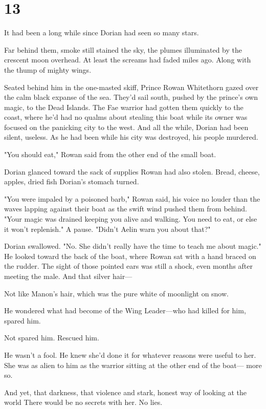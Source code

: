 
\chapter{13}

It had been a long while since Dorian had seen so many stars.

Far behind them, smoke still stained the sky, the plumes illuminated by the crescent moon overhead. At least the screams had faded miles ago. Along with the thump of mighty wings.

Seated behind him in the one-masted skiff, Prince Rowan Whitethorn gazed over the calm black expanse of the sea. They'd sail south, pushed by the prince's own magic, to the Dead Islands. The Fae warrior had gotten them quickly to the coast, where he'd had no qualms about stealing this boat while its owner was focused on the panicking city to the west. And all the while, Dorian had been silent, useless. As he had been while his city was destroyed, his people murdered.

"You should eat," Rowan said from the other end of the small boat.

Dorian glanced toward the sack of supplies Rowan had also stolen. Bread, cheese, apples, dried fish  Dorian's stomach turned.

"You were impaled by a poisoned barb," Rowan said, his voice no louder than the waves lapping against their boat as the swift wind pushed them from behind. "Your magic was drained keeping you alive and walking. You need to eat, or else it won't replenish." A pause. "Didn't Aelin warn you about that?"

Dorian swallowed. "No. She didn't really have the time to teach me about magic." He looked toward the back of the boat, where Rowan sat with a hand braced on the rudder. The sight of those pointed ears was still a shock, even months after meeting the male. And that silver hair---

Not like Manon's hair, which was the pure white of moonlight on snow.

He wondered what had become of the Wing Leader---who had killed for him, spared him.

Not spared him. Rescued him.

He wasn't a fool. He knew she'd done it for whatever reasons were useful to her. She was as alien to him as the warrior sitting at the other end of the boat--- more so.

And yet, that darkness, that violence and stark, honest way of looking at the world  There would be no secrets with her. No lies.

